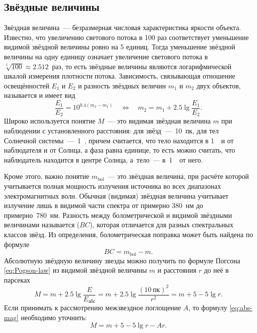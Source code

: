\subsection{Звёздные величины}
Звёздная величина~--- безразмерная числовая характеристика яркости объекта. Известно, что увеличению светового потока в 100 раз соответствует уменьшение видимой звёздной величины ровно на 5 единиц. Тогда уменьшение звёздной величины на одну единицу означает увеличение светового потока в $\sqrt[5]{100}\approx 2.512$~раз, то есть звёздные величины являются логарифмической шкалой измерения плотности потока. Зависимость, связывающая отношение освещённостей $E_1$ и $E_2$ и разность звёздных величин $m_1$ и $m_2$ двух объектов, называется  и имеет вид
\begin{equation}
	\frac{E_1}{E_2} = 10^{0.4(m_2 - m_1)} \quad \Longleftrightarrow \quad m_2 = m_1 + 2.5 \lg \frac{E_1}{E_2}.
	\label{eq:Pogson-law}
\end{equation}
Широко используется понятие  $M$~--- это видимая звёздная величина $m$ при наблюдении с установленного расстояния: для звёзд~---~10~пк, для тел Солнечной системы~---~1~\au, причем считается, что тело находится в 1~\au~и от наблюдателя и от Солнца, а фаза равна единице, то есть можно считать, что наблюдатель находится в центре Солнца, а~тело~--- в~1~\au~от него.

Кроме этого, важно понятие  $m_\text{bol}$~--- это звёздная величина, при расчёте которой учитывается полная мощность излучения источника во всех диапазонах электромагнитных волн. Обычная (видимая) звёздная величина учитывает излучение лишь в видимой части спектра от примерно 380~нм до примерно~780~нм. Разность между болометрической и видимой звёздными величинами называется  ($BC$), которая отличается для разных спектральных классов звёзд. Из определения, болометрическая поправка может быть найдена по формуле
\begin{equation}
	BC = m_\text{bol} - m.
\end{equation}
Абсолютную звёздную величину звезды можно получить по формуле Погсона \eqref{eq:Pogson-law} из видимой звёздной величины $m$ и расстояния $r$ до неё в парсеках
\begin{equation}
	M = m + 2.5 \lg \frac{E}{E_\text{абс}} = m + 2.5 \lg \frac{(10~\text{пк})^2}{r^2} = m + 5 - 5\lg r.
	\label{eq:abs-mag}
\end{equation}
Если принимать к рассмотрению межзвездное поглощение $A$, то формулу  \eqref{eq:abs-mag} необходимо уточнить:
\begin{equation}
	M = m + 5 - 5\lg r - Ar.
\end{equation}
